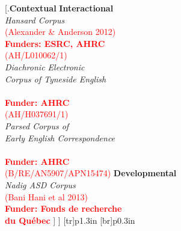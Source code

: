 \documentclass[11pt]{article}
\begin{document}
	[.{\textbf{Contextual}} {\textbf{Interactional}\vspace{1mm}\\
		\textsl{Hansard Corpus}\\
		\textcolor{red}{(Alexander \& Anderson 2012)}\\
		\textcolor{red}{\textbf{Funders: ESRC, AHRC}}\\
		\textcolor{red}{(AH/L010062/1)}\vspace{2mm}\\
		\textsl{Diachronic Electronic}\\ 
		\textsl{Corpus of Tyneside English}\\
		\textcolor{red}{\citep{decte}}\\
		\textcolor{red}{\textbf{Funder: AHRC}}\\
		\textcolor{red}{(AH/H037691/1)}\vspace{2mm}\\
		\textsl{Parsed Corpus of }\\
		\textsl{Early English Correspondence}\\
		\textcolor{red}{\citep{pceec}}\\
		\textcolor{red}{\textbf{Funder: AHRC}}\\
		\textcolor{red}{(B/RE/AN5907/APN15474)}
	} 
	{\textbf{Developmental}\vspace{1mm}\\
		\textsl{Nadig ASD Corpus}\\
		\textcolor{red}{(Bani Hani et al 2013)}\\
		\textcolor{red}{\textbf{Funder: Fonds de recherche}}\\
		\textcolor{red}{\textbf{du Québec}}
	} ] ]
	{\makedash{1pt}[tr]{p1}{.3in}}
	{\makedash{1pt}[br]{p0}{.3in}}






\end{document}

